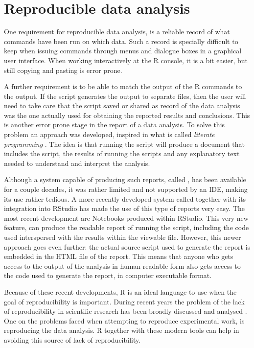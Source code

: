 \documentclass[krantz2,ChapterTOCs]{krantz}\usepackage{knitr}
\begin{document}
\section{Reproducible data analysis}

One requirement for reproducible data analysis, is a reliable record of what commands have been run on which data. Such a record is specially difficult to keep when issuing commands through menus and dialogue boxes in a graphical user interface. When working interactively at the R console, it is a bit easier, but still copying and pasting is error prone.

A further requirement is to be able to match the output of the R commands to the output. If the script generates the output to separate files, then the user will need to take care that the script saved or shared as record of the data analysis was the one actually used for obtaining the reported results and conclusions. This is another error prone stage in the report of a data analysis. To solve this problem an approach was developed, inspired in what is called \emph{literate programming} \autocite{Knuth1984a}. The idea is that running the script will produce a document that includes the script, the results of running the scripts and any explanatory text needed to understand and interpret the analysis.

Although a system capable of producing such reports, called  \autocite{Leisch2002}, has been available for a couple decades, it was rather limited and not supported by an IDE, making its use rather tedious. A more recently developed system called  \autocite{Xie2013} together with its integration into RStudio has made the use of this type of reports very easy. The most recent development are Notebooks produced within RStudio. This very new feature, can produce the readable report of running the script, including the code used interspersed with the results within the viewable file. However, this newer approach goes even further: the actual source script used to generate the report is embedded in the HTML file of the report. This means that anyone who gets access to the output of the analysis in human readable form also gets access to the code used to generate the report, in computer executable format.

Because of these recent developments, R is an ideal language to use when the goal of reproducibility is important. During recent years the problem of the lack of reproducibility in scientific research has been broadly discussed and analysed \autocite{Gandrud2015}. One on the problems faced when attempting to reproduce experimental work, is reproducing the data analysis. R together with these modern tools can help in avoiding this source of lack of reproducibility.
\end{document}

